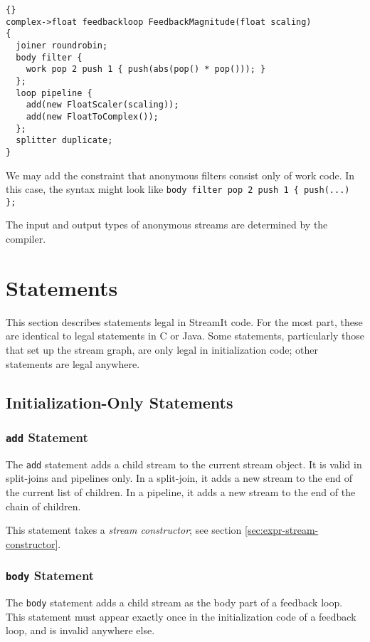 \documentclass[11pt]{article}
\begin{document}
\begin{lstlisting}{}
complex->float feedbackloop FeedbackMagnitude(float scaling)
{
  joiner roundrobin;
  body filter {
    work pop 2 push 1 { push(abs(pop() * pop())); }
  };
  loop pipeline {
    add(new FloatScaler(scaling));
    add(new FloatToComplex());
  };
  splitter duplicate;
}
\end{lstlisting}

\begin{note}
We may add the constraint that anonymous filters consist only of work
code.  In this case, the syntax might look like
\lstinline|body filter pop 2 push 1 { push(...) };|
\end{note}

The input and output types of anonymous streams are determined by the
compiler.

\section{Statements}

This section describes statements legal in StreamIt code.  For the
most part, these are identical to legal statements in C or Java.  Some
statements, particularly those that set up the stream graph, are only
legal in initialization code; other statements are legal anywhere.

\subsection{Initialization-Only Statements}

\subsubsection{\lstinline|add| Statement}

The \lstinline|add| statement adds a child stream to the current stream
object.  It is valid in split-joins and pipelines only.  In a
split-join, it adds a new stream to the end of the current list of
children.  In a pipeline, it adds a new stream to the end of the chain
of children.

This statement takes a \emph{stream constructor}; see section
\ref{sec:expr-stream-constructor}.

\subsubsection{\lstinline|body| Statement}

The \lstinline|body| statement adds a child stream as the body part of a
feedback loop.  This statement must appear exactly once in the
initialization code of a feedback loop, and is invalid anywhere else.
\end{document}
